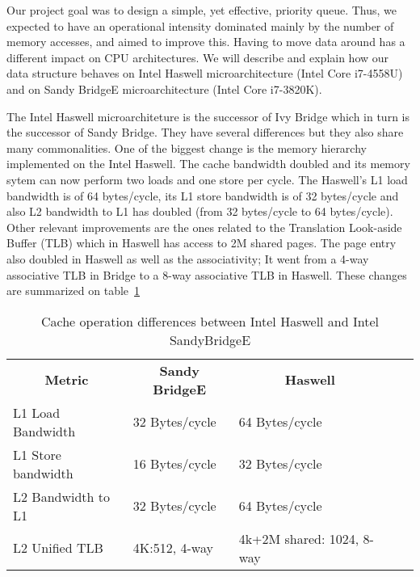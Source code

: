 Our project goal was to design a simple, yet effective, priority queue. Thus, we expected to have an operational intensity dominated mainly by the number of memory accesses, and aimed to improve this. Having to move data around has a different impact on CPU architectures. We will describe and explain how our data structure behaves on Intel Haswell microarchitecture (Intel Core i7-4558U) and on Sandy BridgeE microarchitecture (Intel Core i7-3820K). 

The Intel Haswell microarchiteture is the successor of Ivy Bridge which in turn is the successor of Sandy Bridge. They have several differences but they also share many commonalities. One of the biggest change is the memory hierarchy implemented on the Intel Haswell. The cache bandwidth doubled and its memory sytem can now perform two loads and one store per cycle. The Haswell's L1 load bandwidth is of 64 bytes/cycle, its L1 store bandwidth is of 32 bytes/cycle and also L2 bandwidth to L1 has doubled (from 32 bytes/cycle to 64 bytes/cycle). Other relevant improvements are the ones related to the Translation Look-aside Buffer (TLB) which in Haswell has access to 2M shared pages. The page entry also doubled in Haswell as well as the associativity; It went from a 4-way associative TLB in 
 Bridge to a 8-way associative TLB in Haswell. These changes are summarized on table~\ref{tab:haswell_ivy}~\cite{ijcsit2013040321, microarchitecture, haswell_arch}

\begin{table}[ht]
\footnotesize
\begin{tabular}{|l|l|l|ll}
\cline{1-3}
\multicolumn{1}{|c|}{\textbf{Metric}} & \multicolumn{1}{c|}{\textbf{Sandy BridgeE}} & \multicolumn{1}{c|}{\textbf{Haswell}} &  &  \\ \cline{1-3}
L1 Load Bandwidth                     & 32 Bytes/cycle                           & 64 Bytes/cycle                        &  &  \\ \cline{1-3}
L1 Store bandwidth                    & 16 Bytes/cycle                           & 32 Bytes/cycle                        &  &  \\ \cline{1-3}
L2 Bandwidth to L1                    & 32 Bytes/cycle                           & 64 Bytes/cycle                        &  &  \\ \cline{1-3}
L2 Unified TLB                        & 4K:512, 4-way                            & 4k+2M shared: 1024, 8-way             &  &  \\ \cline{1-3}
\end{tabular}
\caption{Cache operation differences between Intel Haswell and Intel SandyBridgeE}
\label{tab:haswell_ivy}
\end{table}

